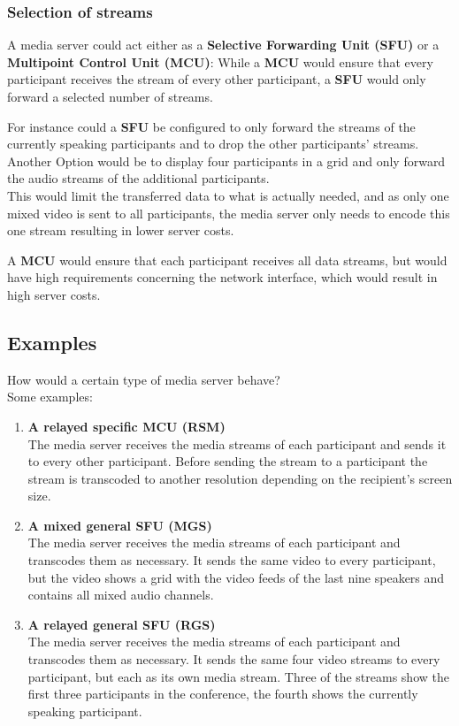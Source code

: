 \documentclass[../../../thesis.tex]{subfiles}
\begin{document}
\subsubsection{Selection of streams}
A media server could act either as a \textbf{Selective Forwarding Unit (SFU)} or a \textbf{Multipoint Control Unit (MCU)}: While a \textbf{MCU} would ensure that every participant receives the stream of every other participant, a \textbf{SFU} would only forward a selected number of streams.\par
For instance could a \textbf{SFU} be configured to only forward the streams of the currently speaking participants and to drop the other participants' streams.\\
Another Option would be to display four participants in a grid and only forward the audio streams of the additional participants.\\
This would limit the transferred data to what is actually needed, and as only one mixed video is sent to all participants, the media server only needs to encode this one stream resulting in lower server costs.\par
A \textbf{MCU} would ensure that each participant receives all data streams, but would have high requirements concerning the network interface, which would result in high server costs.

\clearpage
\subsection{Examples}
How would a certain type of media server behave?\\
Some examples:
\begin{enumerate}
      \item \textbf{A relayed specific MCU (RSM)}\\
      		The media server receives the media streams of each participant and sends it to every other participant. Before sending the stream to a participant the stream is transcoded to another resolution depending on the recipient's screen size.
      \item \textbf{A mixed general SFU (MGS)}\\
      		The media server receives the media streams of each participant and transcodes them as necessary. It sends the same video to every participant, but the video shows a grid with the video feeds of the last nine speakers and contains all mixed audio channels.
      \item \textbf{A relayed general SFU (RGS)}\\
      		The media server receives the media streams of each participant and transcodes them as necessary. It sends the same four video streams to every participant, but each as its own media stream. Three of the streams show the first three participants in the conference, the fourth shows the currently speaking participant.
 \end{enumerate}
\end{document}
